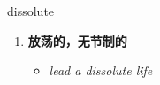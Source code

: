
\begin{frame}
{\huge dissolute}
\begin{center}
\begin{enumerate}\Large
  \item \textbf{放荡的，无节制的}
  \begin{itemize}
    \item \em{\Large{lead a dissolute life}}
  \end{itemize}
\end{enumerate}
\end{center}
\end{frame}
